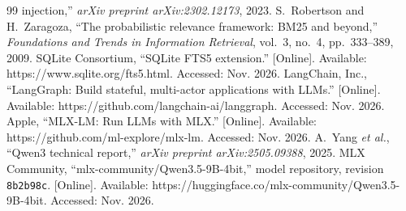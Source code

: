 \begin{thebibliography}{99}
injection,'' \emph{arXiv preprint arXiv:2302.12173}, 2023.
 S.~Robertson and H.~Zaragoza, ``The probabilistic relevance framework: BM25 and
beyond,'' \emph{Foundations and Trends in Information Retrieval}, vol.~3, no.~4, pp.~333--389, 2009.
 SQLite Consortium, ``SQLite FTS5 extension.'' [Online]. Available:
https://www.sqlite.org/fts5.html. Accessed: Nov. 2026.
 LangChain, Inc., ``LangGraph: Build stateful, multi-actor applications with LLMs.''
[Online]. Available: https://github.com/langchain-ai/langgraph. Accessed: Nov. 2026.
 Apple, ``MLX-LM: Run LLMs with MLX.'' [Online]. Available:
https://github.com/ml-explore/mlx-lm. Accessed: Nov. 2026.
 A.~Yang \emph{et al.}, ``Qwen3 technical report,'' \emph{arXiv preprint
arXiv:2505.09388}, 2025.
 MLX Community, ``mlx-community/Qwen3.5-9B-4bit,'' model repository, revision
\texttt{8b2b98c}. [Online]. Available: https://huggingface.co/mlx-community/Qwen3.5-9B-4bit. Accessed: Nov. 2026.
\end{thebibliography}
